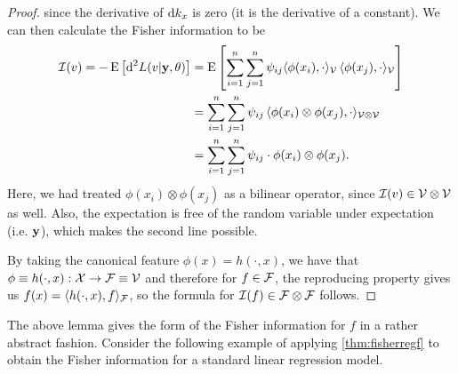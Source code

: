 \begin{proof}
	since the derivative of $\text{d} k_{x}$ is zero (it is the derivative of a constant).
	We can then calculate the Fisher information to be
	\begin{align*}
		{\mathcal I}(v) = -\operatorname{E} \big[ \text{d}^2 L(v|{\mathbf y},\theta) \big] 
		&=\operatorname{E} \left[ \sum_{i=1}^n\sum_{j=1}^n \psi_{ij}  \langle \phi(x_i), \cdot \rangle_{{\mathcal V}} \, \langle \phi(x_j), \cdot \rangle_{{\mathcal V}} \right] \\
		&= \sum_{i=1}^n\sum_{j=1}^n \psi_{ij} \, \langle \phi(x_i) \otimes \phi(x_j), \cdot \rangle_{{\mathcal V}\otimes{\mathcal V}}  \\		
		&=\sum_{i=1}^n\sum_{j=1}^n \psi_{ij} \cdot \phi(x_i) \otimes \phi(x_j).
	\end{align*}	 	
	Here, we had treated $\phi(x_i) \otimes \phi(x_j)$ as a bilinear operator, since ${\mathcal I}(v) \in {\mathcal V} \otimes {\mathcal V}$ as well.
	Also, the expectation is free of the random variable under expectation (i.e. ${\mathbf y}$), which makes the second line possible.
	
	By taking the canonical feature $\phi(x)=h(\cdot,x)$, we have that $\phi \equiv h(\cdot,x):{\mathcal X}\to{\mathcal F} \equiv {\mathcal V}$ and therefore for $f\in{\mathcal F}$, the reproducing property gives us $f(x) = \langle h(\cdot,x),f\rangle_{\mathcal F}$, so the formula for ${\mathcal I}(f) \in {\mathcal F} \otimes {\mathcal F}$ follows.
\end{proof}

The above lemma gives the form of the Fisher information for $f$ in a rather abstract fashion.
Consider the following example of applying \cref{thm:fisherregf} to obtain the Fisher information for a standard linear regression model.

